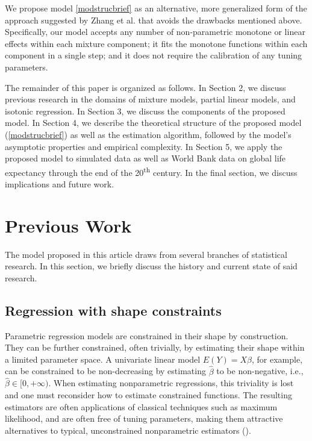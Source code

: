 \documentclass[10pt]{olplainarticle}\usepackage[]{graphicx}\usepackage[]{color}
\begin{document}
We propose model \ref{modstrucbrief} as an alternative, more generalized form of the approach suggested by Zhang et al. that avoids the drawbacks mentioned above. Specifically, our model accepts any number of non-parametric monotone or linear effects within each mixture component; it fits the monotone functions within each component in a single step; and it does not require the calibration of any tuning parameters.

The remainder of this paper is organized as follows. In Section 2, we discuss previous research in the domains of mixture models, partial linear models, and isotonic regression. In Section 3, we discuss the components of the proposed model. In Section 4, we describe the theoretical structure of the proposed model (\ref{modstrucbrief}) as well as the estimation algorithm, followed by the model's asymptotic properties and empirical complexity. In Section 5, we apply the proposed model to simulated data as well as World Bank data on global life expectancy through the end of the 20\textsuperscript{th} century. In the final section, we discuss implications and future work.


\section{Previous Work}

The model proposed in this article draws from several branches of statistical research. In this section, we briefly discuss the history and current state of said research.

\subsection{Regression with shape constraints}

Parametric regression models are constrained in their shape by construction. They can be further constrained, often trivially, by estimating their shape within a limited parameter space. A univariate linear model $E(Y) = X\beta$, for example, can be constrained to be non-decreasing by estimating $\hat{\beta}$ to be non-negative, i.e., $\hat{\beta} \in [0,+\infty)$. When estimating nonparametric regressions, this triviality is lost and one must reconsider how to estimate constrained functions. The resulting estimators are often applications of classical techniques such as maximum likelihood, and are often free of tuning parameters, making them attractive alternatives to typical, unconstrained nonparametric estimators (\cite{guntu}).
\end{document}
